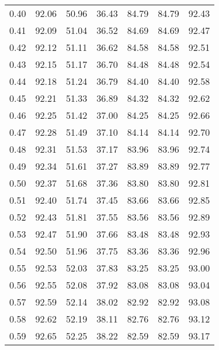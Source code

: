 \begin{tabular}{|c|c|c|c|c|c|c|}
      0.40 &     92.06 &     50.96 &      36.43 &   84.79 &      84.79 &         92.43 \\
      0.41 &     92.09 &     51.04 &      36.52 &   84.69 &      84.69 &         92.47 \\
      0.42 &     92.12 &     51.11 &      36.62 &   84.58 &      84.58 &         92.51 \\
      0.43 &     92.15 &     51.17 &      36.70 &   84.48 &      84.48 &         92.54 \\
      0.44 &     92.18 &     51.24 &      36.79 &   84.40 &      84.40 &         92.58 \\
      0.45 &     92.21 &     51.33 &      36.89 &   84.32 &      84.32 &         92.62 \\
      0.46 &     92.25 &     51.42 &      37.00 &   84.25 &      84.25 &         92.66 \\
      0.47 &     92.28 &     51.49 &      37.10 &   84.14 &      84.14 &         92.70 \\
      0.48 &     92.31 &     51.53 &      37.17 &   83.96 &      83.96 &         92.74 \\
      0.49 &     92.34 &     51.61 &      37.27 &   83.89 &      83.89 &         92.77 \\
      0.50 &     92.37 &     51.68 &      37.36 &   83.80 &      83.80 &         92.81 \\
      0.51 &     92.40 &     51.74 &      37.45 &   83.66 &      83.66 &         92.85 \\
      0.52 &     92.43 &     51.81 &      37.55 &   83.56 &      83.56 &         92.89 \\
      0.53 &     92.47 &     51.90 &      37.66 &   83.48 &      83.48 &         92.93 \\
      0.54 &     92.50 &     51.96 &      37.75 &   83.36 &      83.36 &         92.96 \\
      0.55 &     92.53 &     52.03 &      37.83 &   83.25 &      83.25 &         93.00 \\
      0.56 &     92.55 &     52.08 &      37.92 &   83.08 &      83.08 &         93.04 \\
      0.57 &     92.59 &     52.14 &      38.02 &   82.92 &      82.92 &         93.08 \\
      0.58 &     92.62 &     52.19 &      38.11 &   82.76 &      82.76 &         93.12 \\
      0.59 &     92.65 &     52.25 &      38.22 &   82.59 &      82.59 &         93.17 \\

\end{tabular}

